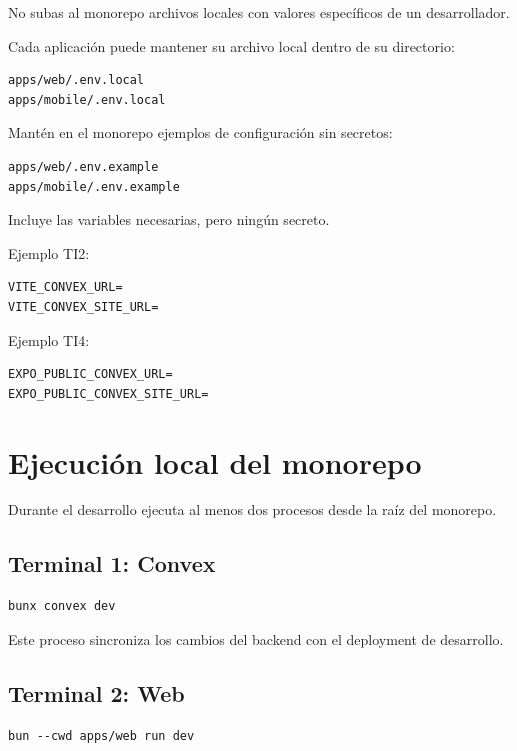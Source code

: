 \documentclass[11pt,a4paper]{article}
\begin{document}
No subas al monorepo archivos locales con valores específicos de un
desarrollador.

Cada aplicación puede mantener su archivo local dentro de su directorio:

\begin{lstlisting}
apps/web/.env.local
apps/mobile/.env.local
\end{lstlisting}

Mantén en el monorepo ejemplos de configuración sin secretos:

\begin{lstlisting}
apps/web/.env.example
apps/mobile/.env.example
\end{lstlisting}

Incluye las variables necesarias, pero ningún secreto.

Ejemplo TI2:

\begin{lstlisting}
VITE_CONVEX_URL=
VITE_CONVEX_SITE_URL=
\end{lstlisting}

Ejemplo TI4:

\begin{lstlisting}
EXPO_PUBLIC_CONVEX_URL=
EXPO_PUBLIC_CONVEX_SITE_URL=
\end{lstlisting}

\section{Ejecución local del monorepo}

Durante el desarrollo ejecuta al menos dos procesos desde la raíz del monorepo.

\subsection{Terminal 1: Convex}

\begin{lstlisting}
bunx convex dev
\end{lstlisting}

Este proceso sincroniza los cambios del backend con el deployment de desarrollo.

\subsection{Terminal 2: Web}

\begin{lstlisting}
bun --cwd apps/web run dev
\end{lstlisting}
\end{document}
